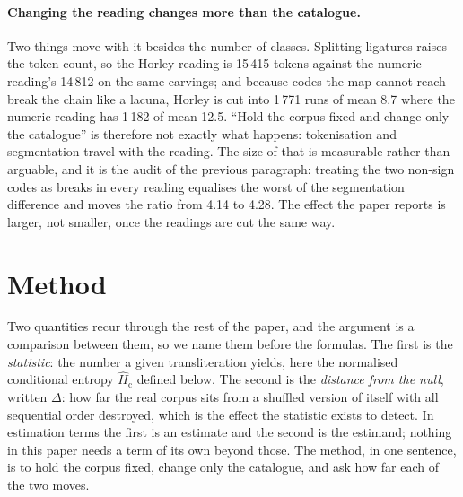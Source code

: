 \documentclass[11pt,a4paper]{article}
\newcommand{\Hcn}{\hat H_{\mathrm{c}}}
\begin{document}
\paragraph{Changing the reading changes more than the catalogue.} Two things move with it besides the number of classes. Splitting ligatures raises the token count, so the Horley reading is 15\,415 tokens against the numeric reading's 14\,812 on the same carvings; and because codes the map cannot reach break the chain like a lacuna, Horley is cut into 1\,771 runs of mean 8.7 where the numeric reading has 1\,182 of mean 12.5. ``Hold the corpus fixed and change only the catalogue'' is therefore not exactly what happens: tokenisation and segmentation travel with the reading. The size of that is measurable rather than arguable, and it is the audit of the previous paragraph: treating the two non-sign codes as breaks in every reading equalises the worst of the segmentation difference and moves the ratio from 4.14 to 4.28. The effect the paper reports is larger, not smaller, once the readings are cut the same way.

\section{Method}
\label{sec:method}

Two quantities recur through the rest of the paper, and the argument is a comparison between them, so we name them before the formulas. The first is the \emph{statistic}: the number a given transliteration yields, here the normalised conditional entropy $\Hcn$ defined below. The second is the \emph{distance from the null}, written $\Delta$: how far the real corpus sits from a shuffled version of itself with all sequential order destroyed, which is the effect the statistic exists to detect. In estimation terms the first is an estimate and the second is the estimand; nothing in this paper needs a term of its own beyond those. The method, in one sentence, is to hold the corpus fixed, change only the catalogue, and ask how far each of the two moves.
\end{document}
